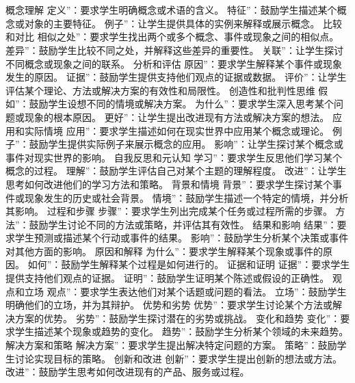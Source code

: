 \documentclass[12pt]{book}
\begin{document}
\section{}
概念理解
定义”：要求学生明确概念或术语的含义。
特征”：鼓励学生描述某个概念或对象的主要特征。
例子”：让学生提供具体的实例来解释或展示概念。
比较和对比
相似之处”：要求学生找出两个或多个概念、事件或现象之间的相似点。
差异”：鼓励学生比较不同之处，并解释这些差异的重要性。
关联”：让学生探讨不同概念或现象之间的联系。
分析和评估
原因”：要求学生解释某个事件或现象发生的原因。
证据”：鼓励学生提供支持他们观点的证据或数据。
评价”：让学生评估某个理论、方法或解决方案的有效性和局限性。
创造性和批判性思维
假如”：鼓励学生设想不同的情境或解决方案。
为什么”：要求学生深入思考某个问题或现象的根本原因。
更好”：让学生提出改进现有方法或解决方案的想法。
应用和实际情境
应用”：要求学生描述如何在现实世界中应用某个概念或理论。
例子”：鼓励学生提供实际例子来展示概念的应用。
影响”：让学生探讨某个概念或事件对现实世界的影响。
自我反思和元认知
学习”：要求学生反思他们学习某个概念的过程。
理解”：鼓励学生评估自己对某个主题的理解程度。
改进”：让学生思考如何改进他们的学习方法和策略。
背景和情境
背景”：要求学生探讨某个事件或现象发生的历史或社会背景。
情境”：鼓励学生描述一个特定的情境，并分析其影响。
过程和步骤
步骤”：要求学生列出完成某个任务或过程所需的步骤。
方法”：鼓励学生讨论不同的方法或策略，并评估其有效性。
结果和影响
结果”：要求学生预测或描述某个行动或事件的结果。
影响”：鼓励学生分析某个决策或事件对其他方面的影响。
原因和解释
为什么”：要求学生解释某个现象或事件的原因。
如何”：鼓励学生解释某个过程是如何进行的。
证据和证明
证据”：要求学生提供支持他们观点的证据。
证明”：鼓励学生证明某个陈述或假设的正确性。
观点和立场
观点”：要求学生表达他们对某个话题或问题的看法。
立场”：鼓励学生明确他们的立场，并为其辩护。
优势和劣势
优势”：要求学生讨论某个方法或解决方案的优势。
劣势”：鼓励学生探讨潜在的劣势或挑战。
变化和趋势
变化”：要求学生描述某个现象或趋势的变化。
趋势”：鼓励学生分析某个领域的未来趋势。
解决方案和策略
解决方案”：要求学生提出解决特定问题的方案。
策略”：鼓励学生讨论实现目标的策略。
创新和改进
创新”：要求学生提出创新的想法或方法。
改进”：鼓励学生思考如何改进现有的产品、服务或过程。
\end{document}
